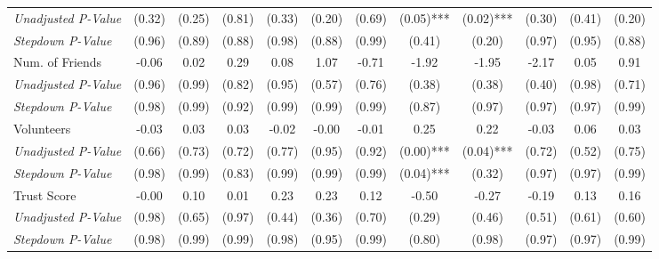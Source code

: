 \begin{tabular}{l c c c c c c c c c c c}
\quad \textit{Unadjusted P-Value} & (0.32) & (0.25) & (0.81) & (0.33) & (0.20) & (0.69) & (0.05)*** & (0.02)*** & (0.30) & (0.41) & (0.20) \\
\quad \textit{Stepdown P-Value} & (0.96) & (0.89) & (0.88) & (0.98) & (0.88) & (0.99) & (0.41) & (0.20) & (0.97) & (0.95) & (0.88) \\
Num. of Friends & -0.06 & 0.02 & 0.29 & 0.08 & 1.07 & -0.71 & -1.92 & -1.95 & -2.17 & 0.05 & 0.91 \\
\quad \textit{Unadjusted P-Value} & (0.96) & (0.99) & (0.82) & (0.95) & (0.57) & (0.76) & (0.38) & (0.38) & (0.40) & (0.98) & (0.71) \\
\quad \textit{Stepdown P-Value} & (0.98) & (0.99) & (0.92) & (0.99) & (0.99) & (0.99) & (0.87) & (0.97) & (0.97) & (0.97) & (0.99) \\
Volunteers & -0.03 & 0.03 & 0.03 & -0.02 & -0.00 & -0.01 & 0.25 & 0.22 & -0.03 & 0.06 & 0.03 \\
\quad \textit{Unadjusted P-Value} & (0.66) & (0.73) & (0.72) & (0.77) & (0.95) & (0.92) & (0.00)*** & (0.04)*** & (0.72) & (0.52) & (0.75) \\
\quad \textit{Stepdown P-Value} & (0.98) & (0.99) & (0.83) & (0.99) & (0.99) & (0.99) & (0.04)*** & (0.32) & (0.97) & (0.97) & (0.99) \\
Trust Score & -0.00 & 0.10 & 0.01 & 0.23 & 0.23 & 0.12 & -0.50 & -0.27 & -0.19 & 0.13 & 0.16 \\
\quad \textit{Unadjusted P-Value} & (0.98) & (0.65) & (0.97) & (0.44) & (0.36) & (0.70) & (0.29) & (0.46) & (0.51) & (0.61) & (0.60) \\
\quad \textit{Stepdown P-Value} & (0.98) & (0.99) & (0.99) & (0.98) & (0.95) & (0.99) & (0.80) & (0.98) & (0.97) & (0.97) & (0.99) \\
\bottomrule
\end{tabular}
